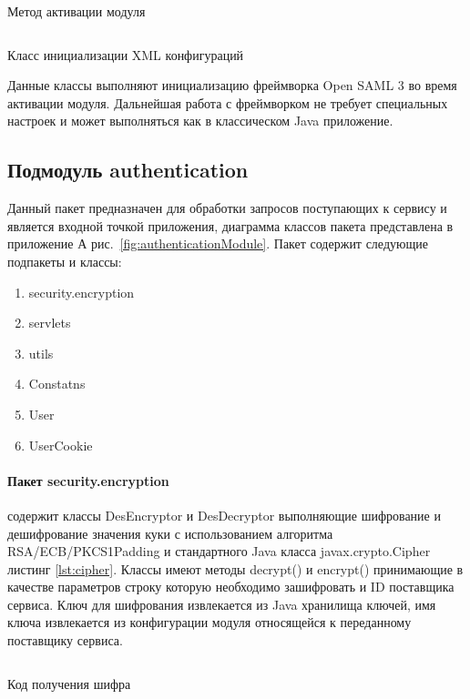 \begin{longlisting}
\inputminted[linenos,frame=single]{java}{inc/src/Activator}
\caption{Метод активации модуля} 
\label{lst:activator}
\end{longlisting}

\begin{longlisting}
\inputminted[linenos,frame=single]{java}{inc/src/InitializationXMLConfigurator}
\caption{Класс инициализации XML конфигураций} 
\label{lst:xmlConfigurator}
\end{longlisting}

Данные классы выполняют инициализацию фреймворка Open SAML 3 во время активации модуля. Дальнейшая работа с фреймворком не требует специальных настроек и может выполняться как в классическом Java приложение.

\subsection{Подмодуль authentication}
Данный пакет предназначен для обработки запросов поступающих к сервису и является входной точкой приложения, диаграмма классов пакета представлена в приложение А рис.~\ref{fig:authenticationModule}. Пакет содержит следующие подпакеты и классы:
\begin{enumerate}
\item security.encryption
\item servlets
\item utils
\item Constatns
\item User
\item UserCookie
\end{enumerate}

\paragraph{Пакет security.encryption} содержит классы DesEncryptor и DesDecryptor  выполняющие шифрование и дешифрование значения куки с использованием алгоритма RSA/ECB/PKCS1Padding и стандартного Java класса javax.crypto.Cipher листинг \ref{lst:cipher}. Классы имеют методы decrypt() и encrypt() принимающие в качестве параметров строку которую необходимо зашифровать и ID поставщика сервиса. Ключ для шифрования извлекается из Java хранилища ключей, имя ключа извлекается из конфигурации модуля относящейся к переданному поставщику сервиса.

\begin{listing}[H]
\inputminted[linenos,frame=single]{java}{inc/src/cipher}
\caption{Код получения шифра} 
\label{lst:cipher}
\end{listing}

